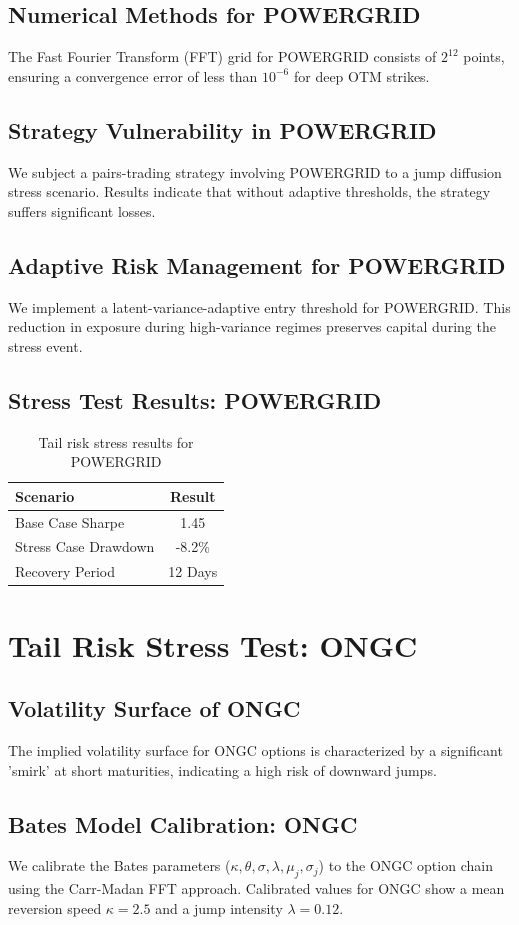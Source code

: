 \documentclass[12pt,a4paper,twoside]{article}
\begin{document}
\subsection{Numerical Methods for POWERGRID}
The Fast Fourier Transform (FFT) grid for POWERGRID consists of $2^{12}$ points, ensuring a convergence error of less than $10^{-6}$ for deep OTM strikes.
\subsection{Strategy Vulnerability in POWERGRID}
We subject a pairs-trading strategy involving POWERGRID to a jump diffusion stress scenario. Results indicate that without adaptive thresholds, the strategy suffers significant losses.
\subsection{Adaptive Risk Management for POWERGRID}
We implement a latent-variance-adaptive entry threshold for POWERGRID. This reduction in exposure during high-variance regimes preserves capital during the stress event.
\subsection{Stress Test Results: POWERGRID}
\begin{table}[H]
\centering
\begin{tabular}{|l|c|}
\hline
Scenario & Result \\
\hline
Base Case Sharpe & 1.45 \\
Stress Case Drawdown & -8.2\% \\
Recovery Period & 12 Days \\
\hline
\end{tabular}
\caption{Tail risk stress results for POWERGRID}
\end{table}
\newpage

\section{Tail Risk Stress Test: ONGC}
\subsection{Volatility Surface of ONGC}
The implied volatility surface for ONGC options is characterized by a significant 'smirk' at short maturities, indicating a high risk of downward jumps.
\subsection{Bates Model Calibration: ONGC}
We calibrate the Bates parameters ($\kappa, \theta, \sigma, \lambda, \mu_j, \sigma_j$) to the ONGC option chain using the Carr-Madan FFT approach.
Calibrated values for ONGC show a mean reversion speed $\kappa = 2.5$ and a jump intensity $\lambda = 0.12$.
\end{document}
